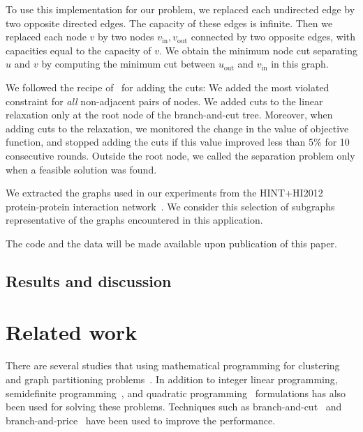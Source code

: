 \documentclass[conference]{IEEEtran}
\begin{document}
To use this implementation for our problem, we replaced
each undirected edge by two opposite directed edges. The capacity of
these edges is infinite. Then we replaced each node $v$ by two
nodes $v_{\text{in}}, v_{\text{out}}$ connected by two opposite
edges, with capacities equal to the capacity of $v$. We obtain the
minimum node cut separating $u$ and $v$ by computing the minimum cut
between $u_{\text{out}}$ and $v_{\text{in}}$ in this graph.

We followed the recipe of~\cite{CarvajalCGVW13} for adding the cuts: We added the most violated constraint for \emph{all} non-adjacent pairs of nodes. We added cuts to the
linear relaxation only at the root node of the branch-and-cut tree.
Moreover, when adding cuts to the relaxation, we monitored the change in
the value of objective function, and stopped adding the cuts if this
value improved less than 5\% for 10 consecutive rounds. Outside the root
node, we called the separation problem only when a feasible solution was
found.

We extracted the graphs used in our experiments from the HINT+HI2012 protein-protein interaction network~\cite{das2012hint,yu2011next}. We consider this selection of subgraphs representative of the graphs encountered in this application.



The code and the data will be made available upon publication of this paper.

\subsection{Results and discussion}

\section{Related work}
\label{sec:related}
There are several studies that using mathematical programming
for clustering and graph partitioning
problems~\cite{HansenJ97}. In addition to integer linear programming, semidefinite programming~\cite{ArmbrusterFHM08,LisserR03}, and quadratic programming~\cite{FanP10} formulations has also been used for solving these problems. Techniques such as branch-and-cut~\cite{FerreiraMSWW98,GrotschelW89} and branch-and-price~\cite{MehrotraT98,JiM07} have been used to improve the performance. 
\end{document}

